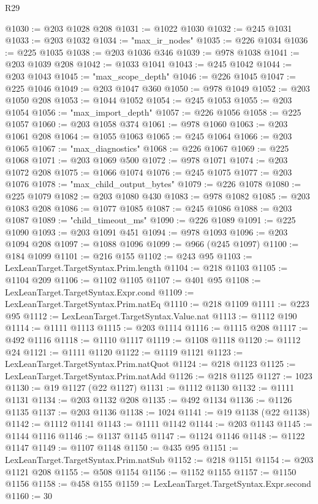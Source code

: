 \begin{lexlean}{R29}
\begin{coremodule}
@1030 := @203 @1028 @208
@1031 := @1022 @1030
@1032 := @245 @1031
@1033 := @203 @1032
@1034 := "max_ir_nodes"
@1035 := @226 @1034
@1036 := @225 @1035
@1038 := @203 @1036 @346
@1039 := @978 @1038
@1041 := @203 @1039 @208
@1042 := @1033 @1041
@1043 := @245 @1042
@1044 := @203 @1043
@1045 := "max_scope_depth"
@1046 := @226 @1045
@1047 := @225 @1046
@1049 := @203 @1047 @360
@1050 := @978 @1049
@1052 := @203 @1050 @208
@1053 := @1044 @1052
@1054 := @245 @1053
@1055 := @203 @1054
@1056 := "max_import_depth"
@1057 := @226 @1056
@1058 := @225 @1057
@1060 := @203 @1058 @374
@1061 := @978 @1060
@1063 := @203 @1061 @208
@1064 := @1055 @1063
@1065 := @245 @1064
@1066 := @203 @1065
@1067 := "max_diagnostics"
@1068 := @226 @1067
@1069 := @225 @1068
@1071 := @203 @1069 @500
@1072 := @978 @1071
@1074 := @203 @1072 @208
@1075 := @1066 @1074
@1076 := @245 @1075
@1077 := @203 @1076
@1078 := "max_child_output_bytes"
@1079 := @226 @1078
@1080 := @225 @1079
@1082 := @203 @1080 @430
@1083 := @978 @1082
@1085 := @203 @1083 @208
@1086 := @1077 @1085
@1087 := @245 @1086
@1088 := @203 @1087
@1089 := "child_timeout_ms"
@1090 := @226 @1089
@1091 := @225 @1090
@1093 := @203 @1091 @451
@1094 := @978 @1093
@1096 := @203 @1094 @208
@1097 := @1088 @1096
@1099 := @966 (@245 @1097)
@1100 := @184 @1099
@1101 := @216 @155
@1102 := @243 @95
@1103 := LexLeanTarget.TargetSyntax.Prim.length
@1104 := @218 @1103
@1105 := @1104 @209
@1106 := @1102 @1105
@1107 := @401 @95
@1108 := LexLeanTarget.TargetSyntax.Expr.cond
@1109 := LexLeanTarget.TargetSyntax.Prim.natEq
@1110 := @218 @1109
@1111 := @223 @95
@1112 := LexLeanTarget.TargetSyntax.Value.nat
@1113 := @1112 @190
@1114 := @1111 @1113
@1115 := @203 @1114
@1116 := @1115 @208
@1117 := @492 @1116
@1118 := @1110 @1117
@1119 := @1108 @1118
@1120 := @1112 @24
@1121 := @1111 @1120
@1122 := @1119 @1121
@1123 := LexLeanTarget.TargetSyntax.Prim.natQuot
@1124 := @218 @1123
@1125 := LexLeanTarget.TargetSyntax.Prim.natAdd
@1126 := @218 @1125
@1127 := 1023
@1130 := @19 @1127 (@22 @1127)
@1131 := @1112 @1130
@1132 := @1111 @1131
@1134 := @203 @1132 @208
@1135 := @492 @1134
@1136 := @1126 @1135
@1137 := @203 @1136
@1138 := 1024
@1141 := @19 @1138 (@22 @1138)
@1142 := @1112 @1141
@1143 := @1111 @1142
@1144 := @203 @1143
@1145 := @1144 @1116
@1146 := @1137 @1145
@1147 := @1124 @1146
@1148 := @1122 @1147
@1149 := @1107 @1148
@1150 := @435 @95
@1151 := LexLeanTarget.TargetSyntax.Prim.natSub
@1152 := @218 @1151
@1154 := @203 @1121 @208
@1155 := @508 @1154
@1156 := @1152 @1155
@1157 := @1150 @1156
@1158 := @458 @155
@1159 := LexLeanTarget.TargetSyntax.Expr.second
@1160 := 30

\end{coremodule}
\end{lexlean}
